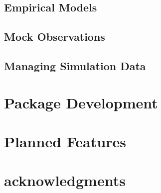 \documentclass[usenatbib,usegraphicx,letterpaper]{mn2e}
\begin{document}
\subsection{Empirical Models}
\label{subsection:empirical_models}

\subsection{Mock Observations}
\label{subsection:mock_observables}

\subsection{Managing Simulation Data}
\label{subsection:sim_manager}

\section{Package Development}
\label{section:development}

\section{Planned Features}
\label{section:planned_features}


\section{acknowledgments}












\end{document}
